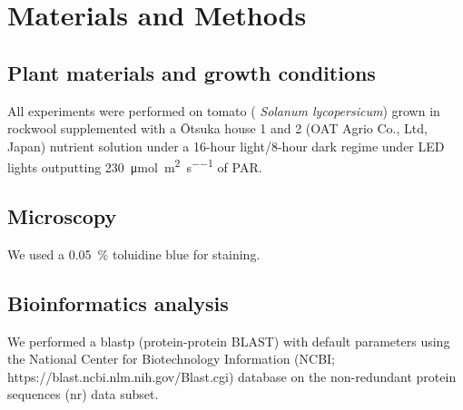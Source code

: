 \section{Materials and Methods}
\subsection{Plant materials and growth conditions}
All experiments were performed on tomato (\textit{ Solanum lycopersicum}) grown in rockwool supplemented with a \={O}tsuka house 1 and 2 (OAT Agrio Co., Ltd, Japan) nutrient solution under a 16-hour light/8-hour dark regime under LED lights outputting \SI{230}{\micro\mole\per\square\meter\per\second} of PAR.

\subsection{Microscopy}
We used a \qty{0.05}{\percent} toluidine blue for staining.

\subsection{Bioinformatics analysis}
We performed a blastp (protein-protein BLAST) with default parameters using the National Center for Biotechnology Information (NCBI; https://blast.ncbi.nlm.nih.gov/Blast.cgi) database on the non-redundant protein sequences (nr) data subset.